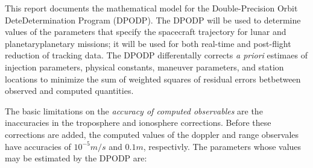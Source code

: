 \documentclass{article}
\begin{document}
\begin{multicols}{2}
  This report documents the mathematical model for the Double-Precision Orbit
  DeteDetermination Program (DPODP). The DPODP will be used to determine values
  of the parameters that specify the spacecraft trajectory for lunar and
  planetaryplanetary missions; it will be used for both real-time and post-flight
  reduction of tracking data. The DPODP differentally corrects \textit{a priori}
  estimaes of injection parameters, physical constants, maneuver parameters, and
  station locations to minimize the sum of weighted squares of residual errors
  betbetween observed and computed quantities.
  
  The basic limitations on the \textit{accuracy of computed observables} are the
  inaccuracies in the troposphere and ionosphere corrections. Before these
  corrections are added, the computed values of the doppler and range observales
  have accuracies of \(10^{-5}m/s\) and \(0.1m\), respectivly. The parameters
  whose values may be estimated by the DPODP are:
  

\end{multicols}
\end{document}
